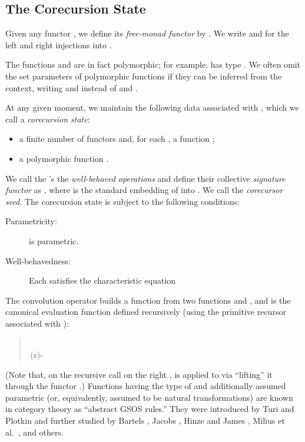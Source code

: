 \documentclass[preprint,draft]
{sigplanconf}
\newcommand{\<}{\langle}
\renewcommand{\>}{\rangle}
\newcommand{\talg}{{{\mathsf{op}}}}
\newcommand{\eval}{{{\mathsf{eval}}}}
\begin{document}
\subsection{The Corecursion State}
\label{sec-state}

Given any functor , we define its {\em free-monad functor}  by .
We write  and  for the left and right injections
into .

The functions  and  are in fact polymorphic; for example,
 has type .
We often omit the set parameters of polymorphic functions if they can be inferred from the context, writing  and  instead of
 and .



At any given moment, we maintain the following data associated with , which we call a
{\em corecursion state}: \begin{itemize}
\item a finite number of functors  and, for each ,
a function ;
\item a polymorphic function .
\end{itemize}
We call the 's the {\em well-behaved operations} and define their
collective {\em signature functor} 
as , where 
is the standard embedding of  into .
We call  the {\em corecursor seed}.
The corecursion state is subject to the following conditions:
\begin{description}
\item[Parametricity:]  is parametric.
\item[Well-behavedness:] Each  satisfies the characteristic equation

\end{description}
The convolution operator  builds a function
 from
two functions  and ,
and  is the canonical
evaluation function defined recursively (using the primitive recursor associated with ):
\begin{quote}
\\
\eval\,(\talg\;z)\kern-\leftmargin
\end{quote}
(Note that, on the recursive call on the right , is applied to  via ``lifting'' it through the functor .)
Functions having the type of 
and additionally assumed parametric (or, equivalently, assumed to be natural transformations)
are known in category theory as ``abstract GSOS rules.''
They were introduced by Turi and Plotkin \cite{turi-plotkin97}
and further studied by Bartels \cite{BartelsGeneralizedCoind}, Jacobs \cite{jacobs06-distrib},
Hinze and James \cite{hinze-adventure},
Milius et al.\ \cite{milius-modular}, and others.
\end{document}
